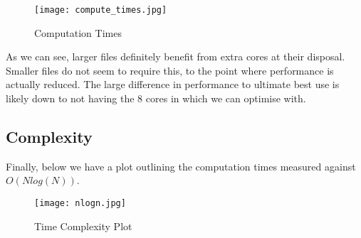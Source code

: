 \documentclass{article}
\begin{document}
\newpage
\begin{figure}[htb]
\begin{center}
\texttt{[image: compute\_times.jpg]}
\caption{Computation Times}
\end{center}
\end{figure}
As we can see, larger files definitely benefit from extra cores at their disposal. Smaller files do not seem to require this, to the point where performance is actually reduced. The large difference in performance to ultimate best use is likely down to not having the 8 cores in which we can optimise with. 
\subsection{Complexity}
Finally, below we have a plot outlining the computation times measured against $O(Nlog(N))$.
\begin{figure}[htb]
\begin{center}
\texttt{[image: nlogn.jpg]}
\caption{Time Complexity Plot}
\end{center}
\end{figure}
\end{document}
